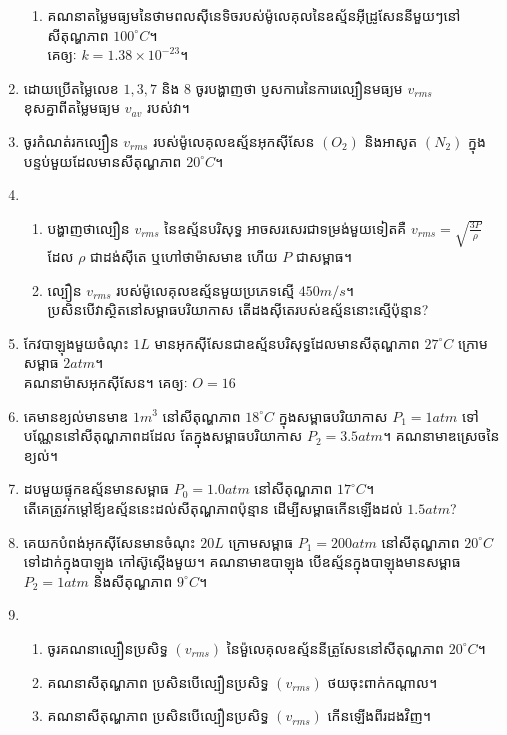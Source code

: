\begin{enumerate}[m]
\begin{enumerate}[k]
		\item គណនាតម្លៃមធ្យមនៃថាមពលសុីនេទិចរបស់ម៉ូលេគុលនៃឧស្ម័នអុីដ្រូសែននីមួយៗនៅសីតុណ្ហភាព $100^\circ C$។\\ គេឲ្យៈ $k=1.38\times10^{-23}$។
	\end{enumerate}
	\item ដោយប្រើតម្លៃលេខ $1,3,7$ និង $8$ ចូរបង្ហាញថា ប្ញសការេនៃការេល្បឿនមធ្យម $v_{rms}$ \\ខុសគ្នាពីតម្លៃមធ្យម $v_{av}$ របស់វា។
	\item ចូរកំណត់រកល្បឿន $v_{rms}$ របស់ម៉ូលេគុលឧស្ម័នអុកសុីសែន $\left(O_{2}\right)$ និងអាសូត $\left(N_2\right)$ ក្នុងបន្ទប់មួយដែលមានសីតុណ្ហភាព $20^\circ C$។
	\item \begin{enumerate}[k]
		\item បង្ហាញថាល្បឿន $v_{rms}$ នៃឧស្ម័នបរិសុទ្ធ អាចសរសេរជាទម្រង់មួយទៀតគឺ $v_{rms}=\sqrt{\frac{3P}{\rho}}$ ដែល $\rho$ ជាដង់សុីតេ ឬហៅថាម៉ាសមាឌ ហើយ $P$ ជាសម្ពាធ។
		\item ល្បឿន $v_{rms}$ របស់ម៉ូលេគុលឧស្ម័នមួយប្រភេទស្មើ $450m/s$។\\ ប្រសិនបើវាស្ថិតនៅសម្ពាធបរិយាកាស តើដងសុីតេរបស់ឧស្ម័ននោះស្មើប៉ុន្មាន?
	\end{enumerate}
	\item កែវបាឡុងមួយចំណុះ $1L$ មានអុកសុីសែនជាឧស្ម័នបរិសុទ្ធដែលមានសីតុណ្ហភាព $27^\circ C$ ក្រោមសម្ពាធ $2atm$។\\
	គណនាម៉ាសអុកសុីសែន។ គេឲ្យៈ $O=16$
	\item គេមានខ្យល់មានមាឌ $1m^3$ នៅសីតុណ្ហភាព $18^\circ C$ ក្នុងសម្ពាធបរិយាកាស $P_{1}=1atm$ ទៅបណ្ណែននៅសីតុណ្ហភាពដដែល តែក្នុងសម្ពាធបរិយាកាស $P_{2}=3.5atm$។ គណនាមាឌស្រេចនៃខ្យល់។
	\item ដបមួយផ្ទុកឧស្ម័នមានសម្ពាធ $P_{0}=1.0atm$ នៅសីតុណ្ហភាព $17^\circ C$។\\
	តើគេត្រូវកម្តៅឪ្យឧស្ម័ននេះដល់សីតុណ្ហភាពប៉ុន្មាន ដើម្បីសម្ពាធកើនឡើងដល់ $1.5atm$?
	\item គេយកបំពង់អុកសុីសែនមានចំណុះ $20L$ ក្រោមសម្ពាធ $P_{1}=200atm$ នៅសីតុណ្ហភាព $20^\circ C$ ទៅដាក់ក្នុងបាឡុង កៅស៊ូស្តើងមួយ។ គណនាមាឌបាឡុង បើឧស្ម័នក្នុងបាឡុងមានសម្ពាធ $P_{2}=1atm$ និងសីតុណ្ហភាព $9^\circ C$។
	\item \begin{enumerate}[k]
		\item ចូរគណនាល្បឿនប្រសិទ្ធ $\left(v_{rms}\right)$ នៃម៉ួលេគុលឧស្ម័ននីត្រូសែននៅសីតុណ្ហភាព $20^\circ C$។
		\item គណនាសីតុណ្ហភាព ប្រសិនបើល្បឿនប្រសិទ្ធ $\left(v_{rms}\right)$ ថយចុះពាក់កណ្តាល។
		\item គណនាសីតុណ្ហភាព ប្រសិនបើល្បឿនប្រសិទ្ធ $\left(v_{rms}\right)$ កើនឡើងពីរដងវិញ។

\end{enumerate}
\end{enumerate}
